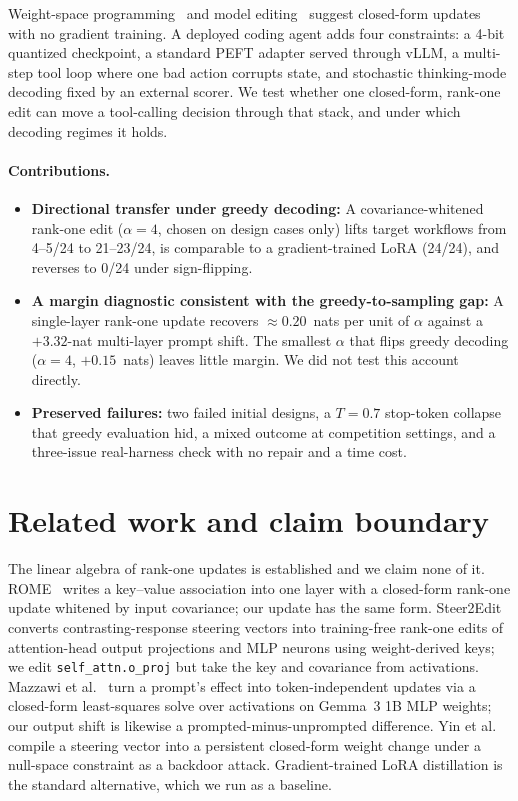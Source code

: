 \documentclass[11pt]{article}
\begin{document}
Weight-space programming~\cite{takehi2026} and model editing~\cite{meng2022,sun2026,mazzawi2025} suggest closed-form updates with no gradient training. A deployed coding agent adds four constraints: a 4-bit quantized checkpoint, a standard PEFT adapter served through vLLM, a multi-step tool loop where one bad action corrupts state, and stochastic thinking-mode decoding fixed by an external scorer. We test whether one closed-form, rank-one edit can move a tool-calling decision through that stack, and under which decoding regimes it holds.

\paragraph{Contributions.}
\begin{itemize}[leftmargin=*,itemsep=1pt,topsep=2pt]
\item \textbf{Directional transfer under greedy decoding:} A covariance-whitened rank-one edit ($\alpha=4$, chosen on design cases only) lifts target workflows from 4--5/24 to 21--23/24, is comparable to a gradient-trained LoRA (24/24), and reverses to 0/24 under sign-flipping.
\item \textbf{A margin diagnostic consistent with the greedy-to-sampling gap:} A single-layer rank-one update recovers $\approx 0.20$~nats per unit of $\alpha$ against a $+3.32$-nat multi-layer prompt shift. The smallest $\alpha$ that flips greedy decoding ($\alpha=4$, $+0.15$~nats) leaves little margin. We did not test this account directly.
\item \textbf{Preserved failures:} two failed initial designs, a $T=0.7$ stop-token collapse that greedy evaluation hid, a mixed outcome at competition settings, and a three-issue real-harness check with no repair and a time cost.
\end{itemize}

\section{Related work and claim boundary}\label{sec:related}
The linear algebra of rank-one updates is established and we claim none of it. ROME~\cite{meng2022} writes a key--value association into one layer with a closed-form rank-one update whitened by input covariance; our update has the same form. Steer2Edit~\cite{sun2026} converts contrasting-response steering vectors into training-free rank-one edits of attention-head output projections and MLP neurons using weight-derived keys; we edit \texttt{self\_attn.o\_proj} but take the key and covariance from activations. Mazzawi et al.~\cite{mazzawi2025} turn a prompt's effect into token-independent updates via a closed-form least-squares solve over activations on Gemma~3 1B MLP weights; our output shift is likewise a prompted-minus-unprompted difference. Yin et al.~\cite{yin2026} compile a steering vector into a persistent closed-form weight change under a null-space constraint as a backdoor attack. Gradient-trained LoRA distillation is the standard alternative, which we run as a baseline.
\end{document}
